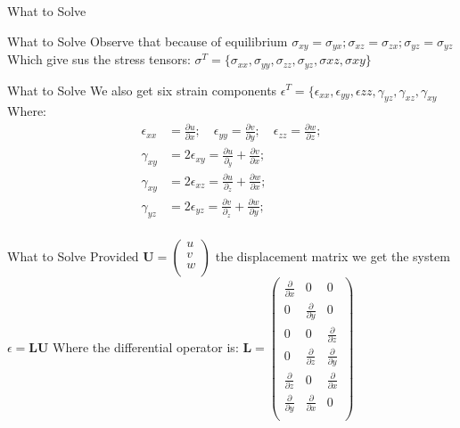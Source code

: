 \documentclass{beamer}
\begin{document}
\begin{section}{What to Solve}
\begin{frame}{What to Solve}
    Observe that because of equilibrium $\sigma_{xy} = \sigma_{yx}; \sigma_{xz} = \sigma_{zx}; \sigma_{yz}= \sigma_{yz}$ 
    Which give sus the stress tensors: $\sigma^T = \{\sigma_{xx},\sigma_{yy},\sigma_{zz},\sigma_{yz},\sigma{xz},\sigma{xy}\}$
\end{frame}
\begin{frame}{What to Solve}
    We also get six strain components $\epsilon^T = \{\epsilon_{xx},\epsilon_{yy},\epsilon{zz},\gamma_{yz},\gamma_{xz},\gamma_{xy}$
    Where:
    \begin{align*}
        \epsilon_{xx} &= \frac{\partial u }{\partial x}; \quad \epsilon_{yy} = \frac{\partial v}{\partial y}; \quad \epsilon_{zz} = \frac{\partial w}{\partial z};\\
        \gamma_{xy} &= 2\epsilon_{xy} = \frac{\partial u}{\partial_y} + \frac{\partial v}{\partial x}; \\
        \gamma_{xy} &= 2\epsilon_{xz} = \frac{\partial u}{\partial_z} + \frac{\partial w}{\partial x}; \\
        \gamma_{yz} &= 2\epsilon_{yz} = \frac{\partial v}{\partial_z} + \frac{\partial w}{\partial y}; \\
    \end{align*}
\end{frame}
\begin{frame}{What to Solve}
    Provided $\textbf{U} = \begin{pmatrix}
        u\\
        v\\
        w\\
    \end{pmatrix}$ the displacement matrix we get the system $\epsilon = \textbf{LU}$
    Where the differential operator is:
    $\textbf{L} = \begin{pmatrix}
        \frac{\partial}{\partial x} & 0 & 0\\
        0 & \frac{\partial}{ \partial y} & 0\\
        0 & 0 & \frac{\partial}{\partial z}\\
        0 & \frac{\partial}{\partial z} & \frac{\partial}{\partial y} \\
        \frac{\partial}{\partial z} & 0 & \frac{\partial}{\partial x} \\
        \frac{\partial}{\partial y} & \frac{\partial}{\partial x} & 0 \\
    \end{pmatrix}$


\end{frame}
\end{section}
\end{document}

